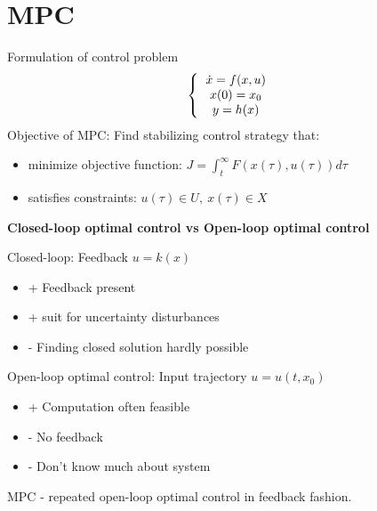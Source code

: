 \section{MPC}
Formulation of control problem
\begin{equation*}
\left \{
  \begin{tabular}{c}
  $\dot x = f(x,u)$ \\
  $x(0) = x_0$ \\
  $y = h(x)$
  \end{tabular}
  \right. 
\end{equation*}
Objective of MPC: Find stabilizing control strategy that:
\begin{itemize}
\item minimize objective function: $J = \int_{t}^{\infty}F(x(\tau),u(\tau))d\tau$
\item satisfies constraints:
$u(\tau) \in U ,\  x(\tau) \in X$
\end{itemize}

\textbf{Closed-loop optimal control vs Open-loop optimal control}
\newline

Closed-loop: Feedback $u=k(x)$ 
\begin{itemize}
\item + Feedback present
\item + suit for uncertainty disturbances
\item - Finding closed solution hardly possible
\end{itemize}

Open-loop optimal control: Input trajectory $u = u(t, x_0)$
\begin{itemize}
\item + Computation often feasible
\item - No feedback
\item - Don't know much about system
\end{itemize}

MPC - repeated open-loop optimal control in feedback fashion.